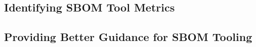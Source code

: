 \subsection{Identifying SBOM Tool Metrics}

\subsection{Providing Better Guidance for SBOM Tooling}


